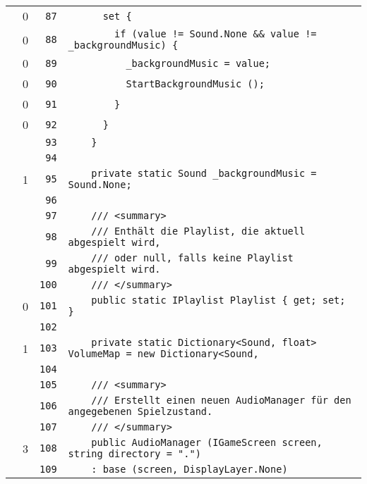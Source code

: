 \documentclass[a4paper,10pt]{article}
\begin{document}
\begin{longtable}[l]{lrrl}
\cellcolor{red} & 0 & \verb~87~ & \verb~      set {~\\
\cellcolor{red} & 0 & \verb~88~ & \verb~        if (value != Sound.None && value != _backgroundMusic) {~\\
\cellcolor{red} & 0 & \verb~89~ & \verb~          _backgroundMusic = value;~\\
\cellcolor{red} & 0 & \verb~90~ & \verb~          StartBackgroundMusic ();~\\
\cellcolor{red} & 0 & \verb~91~ & \verb~        }~\\
\cellcolor{red} & 0 & \verb~92~ & \verb~      }~\\
\cellcolor{gray} &  & \verb~93~ & \verb~    }~\\
\cellcolor{gray} &  & \verb~94~ & \verb~~\\
\cellcolor{green} & 1 & \verb~95~ & \verb~    private static Sound _backgroundMusic = Sound.None;~\\
\cellcolor{gray} &  & \verb~96~ & \verb~~\\
\cellcolor{gray} &  & \verb~97~ & \verb~    /// <summary>~\\
\cellcolor{gray} &  & \verb~98~ & \verb~    /// Enthält die Playlist, die aktuell abgespielt wird,~\\
\cellcolor{gray} &  & \verb~99~ & \verb~    /// oder null, falls keine Playlist abgespielt wird.~\\
\cellcolor{gray} &  & \verb~100~ & \verb~    /// </summary>~\\
\cellcolor{red} & 0 & \verb~101~ & \verb~    public static IPlaylist Playlist { get; set; }~\\
\cellcolor{gray} &  & \verb~102~ & \verb~~\\
\cellcolor{green} & 1 & \verb~103~ & \verb~    private static Dictionary<Sound, float> VolumeMap = new Dictionary<Sound, ~\\
\cellcolor{gray} &  & \verb~104~ & \verb~~\\
\cellcolor{gray} &  & \verb~105~ & \verb~    /// <summary>~\\
\cellcolor{gray} &  & \verb~106~ & \verb~    /// Erstellt einen neuen AudioManager für den angegebenen Spielzustand.~\\
\cellcolor{gray} &  & \verb~107~ & \verb~    /// </summary>~\\
\cellcolor{green} & 3 & \verb~108~ & \verb~    public AudioManager (IGameScreen screen, string directory = ".")~\\
\cellcolor{gray} &  & \verb~109~ & \verb~    : base (screen, DisplayLayer.None)~\\

\end{longtable}
\end{document}
